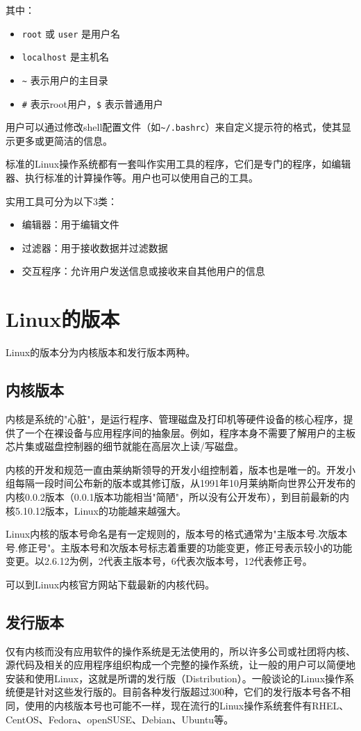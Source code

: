 \documentclass[12pt,UTF8]{ctexbook}
\begin{document}
其中：
\begin{itemize}
    \item \verb|root| 或 \verb|user| 是用户名
    \item \verb|localhost| 是主机名
    \item \verb|~| 表示用户的主目录
    \item \verb|#| 表示root用户，\verb|$| 表示普通用户
\end{itemize}

用户可以通过修改shell配置文件（如\verb|~/.bashrc|）来自定义提示符的格式，使其显示更多或更简洁的信息。

标准的Linux操作系统都有一套叫作实用工具的程序，它们是专门的程序，如编辑器、执行标准的计算操作等。用户也可以使用自己的工具。

实用工具可分为以下3类：
\begin{itemize}
    \item 编辑器：用于编辑文件
    \item 过滤器：用于接收数据并过滤数据
    \item 交互程序：允许用户发送信息或接收来自其他用户的信息
\end{itemize}

\section{Linux的版本}
Linux的版本分为内核版本和发行版本两种。

\subsection{内核版本}
内核是系统的"心脏"，是运行程序、管理磁盘及打印机等硬件设备的核心程序，提供了一个在裸设备与应用程序间的抽象层。例如，程序本身不需要了解用户的主板芯片集或磁盘控制器的细节就能在高层次上读/写磁盘。

内核的开发和规范一直由莱纳斯领导的开发小组控制着，版本也是唯一的。开发小组每隔一段时间公布新的版本或其修订版，从1991年10月莱纳斯向世界公开发布的内核0.0.2版本（0.0.1版本功能相当"简陋"，所以没有公开发布），到目前最新的内核5.10.12版本，Linux的功能越来越强大。

Linux内核的版本号命名是有一定规则的，版本号的格式通常为"主版本号.次版本号.修正号"。主版本号和次版本号标志着重要的功能变更，修正号表示较小的功能变更。以2.6.12为例，2代表主版本号，6代表次版本号，12代表修正号。

可以到Linux内核官方网站下载最新的内核代码。

\subsection{发行版本}
仅有内核而没有应用软件的操作系统是无法使用的，所以许多公司或社团将内核、源代码及相关的应用程序组织构成一个完整的操作系统，让一般的用户可以简便地安装和使用Linux，这就是所谓的发行版（Distribution）。一般谈论的Linux操作系统便是针对这些发行版的。目前各种发行版超过300种，它们的发行版本号各不相同，使用的内核版本号也可能不一样，现在流行的Linux操作系统套件有RHEL、CentOS、Fedora、openSUSE、Debian、Ubuntu等。
\end{document}
